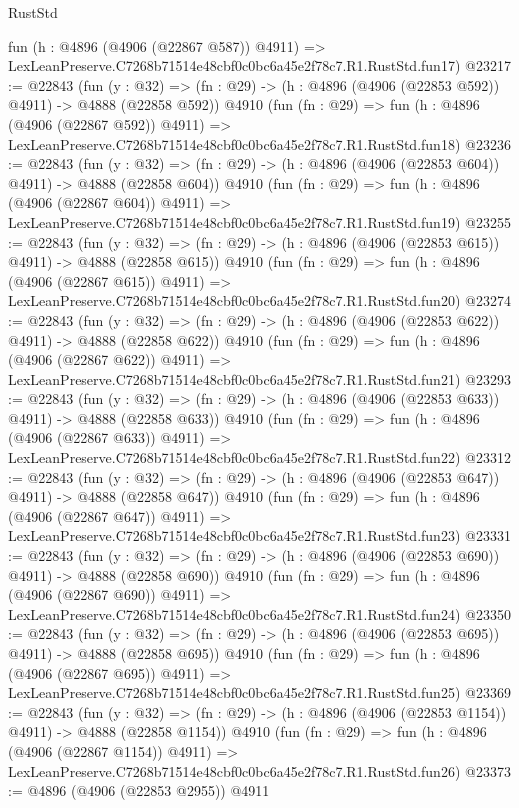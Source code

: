 \begin{lexlean}{RustStd}
\begin{coremodule}
    fun (h : @4896 (@4906 (@22867 @587)) @4911) =>
    LexLeanPreserve.C7268b71514e48cbf0c0bc6a45e2f78c7.R1.RustStd.fun17)
@23217 := @22843
    (fun (y : @32) => (fn : @29) -> (h : @4896 (@4906 (@22853 @592)) @4911) -> @4888 (@22858 @592))
    @4910
    (fun (fn : @29) =>
    fun (h : @4896 (@4906 (@22867 @592)) @4911) =>
    LexLeanPreserve.C7268b71514e48cbf0c0bc6a45e2f78c7.R1.RustStd.fun18)
@23236 := @22843
    (fun (y : @32) => (fn : @29) -> (h : @4896 (@4906 (@22853 @604)) @4911) -> @4888 (@22858 @604))
    @4910
    (fun (fn : @29) =>
    fun (h : @4896 (@4906 (@22867 @604)) @4911) =>
    LexLeanPreserve.C7268b71514e48cbf0c0bc6a45e2f78c7.R1.RustStd.fun19)
@23255 := @22843
    (fun (y : @32) => (fn : @29) -> (h : @4896 (@4906 (@22853 @615)) @4911) -> @4888 (@22858 @615))
    @4910
    (fun (fn : @29) =>
    fun (h : @4896 (@4906 (@22867 @615)) @4911) =>
    LexLeanPreserve.C7268b71514e48cbf0c0bc6a45e2f78c7.R1.RustStd.fun20)
@23274 := @22843
    (fun (y : @32) => (fn : @29) -> (h : @4896 (@4906 (@22853 @622)) @4911) -> @4888 (@22858 @622))
    @4910
    (fun (fn : @29) =>
    fun (h : @4896 (@4906 (@22867 @622)) @4911) =>
    LexLeanPreserve.C7268b71514e48cbf0c0bc6a45e2f78c7.R1.RustStd.fun21)
@23293 := @22843
    (fun (y : @32) => (fn : @29) -> (h : @4896 (@4906 (@22853 @633)) @4911) -> @4888 (@22858 @633))
    @4910
    (fun (fn : @29) =>
    fun (h : @4896 (@4906 (@22867 @633)) @4911) =>
    LexLeanPreserve.C7268b71514e48cbf0c0bc6a45e2f78c7.R1.RustStd.fun22)
@23312 := @22843
    (fun (y : @32) => (fn : @29) -> (h : @4896 (@4906 (@22853 @647)) @4911) -> @4888 (@22858 @647))
    @4910
    (fun (fn : @29) =>
    fun (h : @4896 (@4906 (@22867 @647)) @4911) =>
    LexLeanPreserve.C7268b71514e48cbf0c0bc6a45e2f78c7.R1.RustStd.fun23)
@23331 := @22843
    (fun (y : @32) => (fn : @29) -> (h : @4896 (@4906 (@22853 @690)) @4911) -> @4888 (@22858 @690))
    @4910
    (fun (fn : @29) =>
    fun (h : @4896 (@4906 (@22867 @690)) @4911) =>
    LexLeanPreserve.C7268b71514e48cbf0c0bc6a45e2f78c7.R1.RustStd.fun24)
@23350 := @22843
    (fun (y : @32) => (fn : @29) -> (h : @4896 (@4906 (@22853 @695)) @4911) -> @4888 (@22858 @695))
    @4910
    (fun (fn : @29) =>
    fun (h : @4896 (@4906 (@22867 @695)) @4911) =>
    LexLeanPreserve.C7268b71514e48cbf0c0bc6a45e2f78c7.R1.RustStd.fun25)
@23369 := @22843
    (fun (y : @32) =>
    (fn : @29) -> (h : @4896 (@4906 (@22853 @1154)) @4911) -> @4888 (@22858 @1154))
    @4910
    (fun (fn : @29) =>
    fun (h : @4896 (@4906 (@22867 @1154)) @4911) =>
    LexLeanPreserve.C7268b71514e48cbf0c0bc6a45e2f78c7.R1.RustStd.fun26)
@23373 := @4896 (@4906 (@22853 @2955)) @4911

\end{coremodule}
\end{lexlean}
